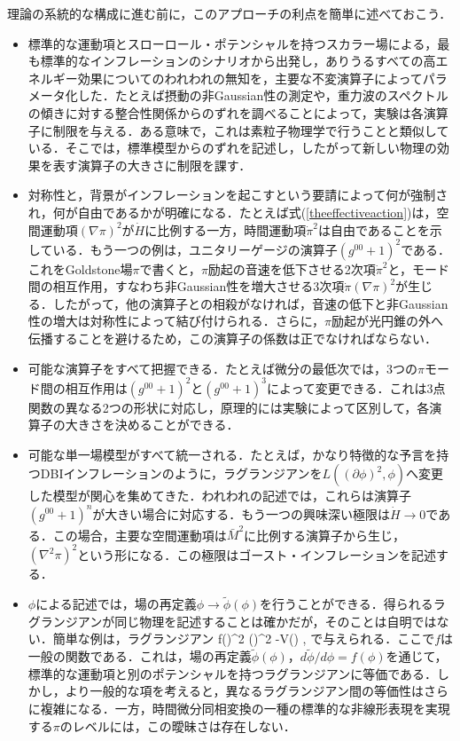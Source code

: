 理論の系統的な構成に進む前に，このアプローチの利点を簡単に述べておこう．
\begin{itemize}
\item 標準的な運動項とスローロール・ポテンシャルを持つスカラー場による，最も標準的なインフレーションのシナリオから出発し，ありうるすべての高エネルギー効果についてのわれわれの無知を，主要な不変演算子によってパラメータ化した．たとえば摂動の非Gaussian性の測定や，重力波のスペクトルの傾きに対する整合性関係からのずれを調べることによって，実験は各演算子に制限を与える．ある意味で，これは素粒子物理学で行うことと類似している．そこでは，標準模型からのずれを記述し，したがって新しい物理の効果を表す演算子の大きさに制限を課す．

\item 対称性と，背景がインフレーションを起こすという要請によって何が強制され，何が自由であるかが明確になる．たとえば式(\ref{theeffectiveaction})は，空間運動項$(\nabla \pi)^2$が$\dot H$に比例する一方，時間運動項$\dot\pi^2$は自由であることを示している．もう一つの例は，ユニタリーゲージの演算子$(g^{00}+1)^2$である．これをGoldstone場$\pi$で書くと，$\pi$励起の音速を低下させる2次項$\dot\pi^2$と，モード間の相互作用，すなわち非Gaussian性を増大させる3次項$\dot\pi (\nabla\pi)^2$が生じる．したがって，他の演算子との相殺がなければ，音速の低下と非Gaussian性の増大は対称性によって結び付けられる．さらに，$\pi$励起が光円錐の外へ伝播することを避けるため，この演算子の係数は正でなければならない．

\item 可能な演算子をすべて把握できる．たとえば微分の最低次では，3つの$\pi$モード間の相互作用は$(g^{00}+1)^2$と$(g^{00}+1)^3$によって変更できる．これは3点関数の異なる2つの形状に対応し，原理的には実験によって区別して，各演算子の大きさを決めることができる．

\item 可能な単一場模型がすべて統一される．たとえば，かなり特徴的な予言を持つDBIインフレーション\cite{Alishahiha:2004eh,Chen:2005ad,Shandera:2006ax,Kecskemeti:2006cg,Shiu:2006kj}のように，ラグランジアンを$L((\partial\phi)^2,\phi)$へ変更した模型が関心を集めてきた．われわれの記述では，これらは演算子$(g^{00}+1)^n$が大きい場合に対応する．もう一つの興味深い極限は$\dot H \to 0$である．この場合，主要な空間運動項は$\bar M^2$に比例する演算子から生じ，$(\nabla^2 \pi)^2$という形になる．この極限はゴースト・インフレーション\cite{Arkani-Hamed:2003juy}を記述する．

\item $\phi$による記述では，場の再定義$\phi \to \tilde\phi(\phi)$を行うことができる．得られるラグランジアンが同じ物理を記述することは確かだが，そのことは自明ではない．簡単な例は，ラグランジアン
\be
f(\phi)^2 (\partial\phi)^2 -V(\phi) \;,
\ee
で与えられる．ここで$f$は一般の関数である．これは，場の再定義$\tilde\phi(\phi)$，$d\tilde\phi/d\phi = f(\phi)$を通じて，標準的な運動項と別のポテンシャルを持つラグランジアンに等価である．しかし，より一般的な項を考えると，異なるラグランジアン間の等価性はさらに複雑になる．一方，時間微分同相変換の一種の標準的な非線形表現を実現する$\pi$のレベルには，この曖昧さは存在しない．


\end{itemize}
